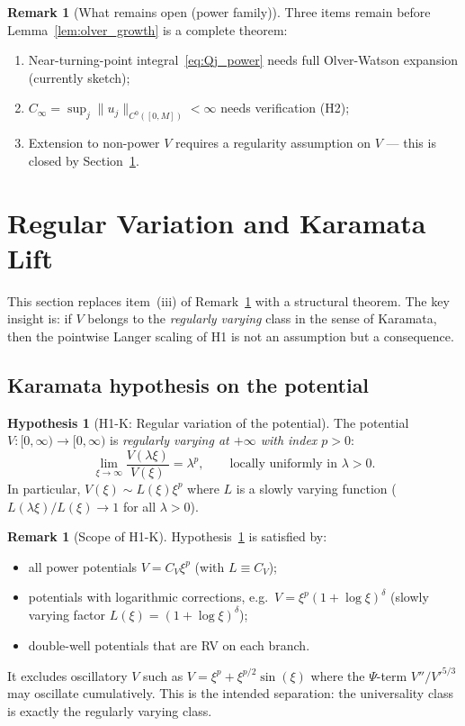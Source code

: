 \documentclass[12pt,a4paper]{amsart}
\theoremstyle{definition}
\newtheorem{hypothesis}[theorem]{Hypothesis}
\newtheorem{remark}[theorem]{Remark}
\begin{document}
\begin{remark}[What remains open (power family)]
\label{rem:open_power}
Three items remain before Lemma~\ref{lem:olver_growth}
is a complete theorem:
\begin{enumerate}[label=(\roman*),nosep]
  \item Near-turning-point integral~\eqref{eq:Qj_power}
    needs full Olver-Watson expansion (currently sketch);
  \item $C_\infty = \sup_j\|u_j\|_{C^0([0,M])} < \infty$
    needs verification (H2);
  \item Extension to non-power $V$ requires a regularity assumption
    on $V$ --- this is closed by Section~\ref{sec:karamata}.
\end{enumerate}
\end{remark}

\section{Regular Variation and Karamata Lift}
\label{sec:karamata}

This section replaces item~(iii) of Remark~\ref{rem:open_power}
with a structural theorem.
The key insight is: if $V$ belongs to the \emph{regularly varying}
class in the sense of Karamata, then the pointwise Langer scaling
of H1 is not an assumption but a consequence.

\subsection{Karamata hypothesis on the potential}

\begin{hypothesis}[H1-K: Regular variation of the potential]
\label{hyp:karamata}
The potential $V\colon[0,\infty)\to[0,\infty)$ is
\emph{regularly varying at $+\infty$ with index $p>0$}:
\[
  \lim_{\xi\to\infty}\frac{V(\lambda\xi)}{V(\xi)} = \lambda^p,
  \qquad\text{locally uniformly in }\lambda>0.
\]
In particular, $V(\xi)\sim L(\xi)\xi^p$ where $L$ is a
slowly varying function ($L(\lambda\xi)/L(\xi)\to 1$
for all $\lambda>0$).
\end{hypothesis}

\begin{remark}[Scope of H1-K]
\label{rem:h1k_scope}
Hypothesis~\ref{hyp:karamata} is satisfied by:
\begin{itemize}[nosep]
  \item all power potentials $V = C_V\xi^p$ (with $L\equiv C_V$);
  \item potentials with logarithmic corrections,
    e.g.\ $V = \xi^p(1+\log\xi)^\delta$
    (slowly varying factor $L(\xi) = (1+\log\xi)^\delta$);
  \item double-well potentials that are RV on each branch.
\end{itemize}
It excludes oscillatory $V$ such as
$V = \xi^p + \xi^{p/2}\sin(\xi)$ where the
$\Psi$-term $V''/V'^{5/3}$ may oscillate cumulatively.
This is the intended separation: the universality class is
exactly the regularly varying class.
\end{remark}
\end{document}
